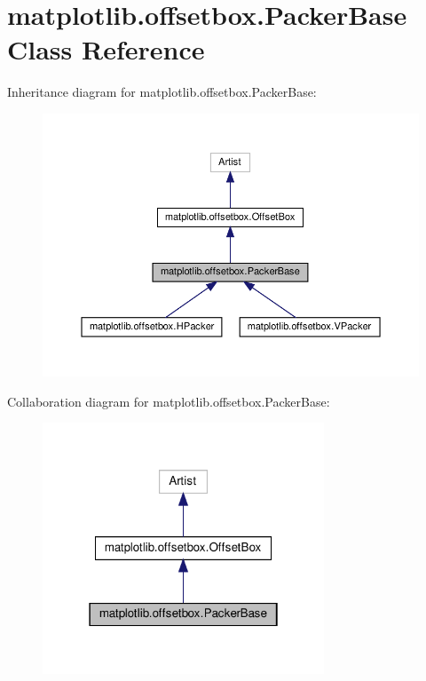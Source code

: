 \hypertarget{classmatplotlib_1_1offsetbox_1_1PackerBase}{}\section{matplotlib.\+offsetbox.\+Packer\+Base Class Reference}
\label{classmatplotlib_1_1offsetbox_1_1PackerBase}


Inheritance diagram for matplotlib.\+offsetbox.\+Packer\+Base\+:
\nopagebreak
\begin{figure}[H]
\begin{center}
\leavevmode
\includegraphics[width=350pt]{classmatplotlib_1_1offsetbox_1_1PackerBase__inherit__graph}
\end{center}
\end{figure}


Collaboration diagram for matplotlib.\+offsetbox.\+Packer\+Base\+:
\nopagebreak
\begin{figure}[H]
\begin{center}
\leavevmode
\includegraphics[width=238pt]{classmatplotlib_1_1offsetbox_1_1PackerBase__coll__graph}
\end{center}
\end{figure}
